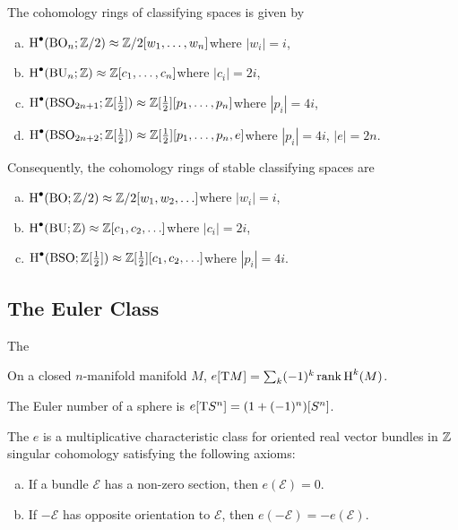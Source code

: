 \begin{theorem}\label{thm:cohomology-o}
	The cohomology rings of classifying spaces is given by
	\begin{enumerate}[(a)]
		\item $\operatorname{H}^\bullet(\mathrm{BO}_n;\mathbb{Z}/2)\approx \mathbb{Z}/2[w_1,\ldots, w_n]$\hfill where $|w_i|=i$,
		\item $\operatorname{H}^\bullet(\mathrm{BU}_n;\mathbb{Z})\approx \mathbb{Z}[c_1,\ldots, c_n]$\hfill where $|c_i|=2i$,
		\item $\operatorname{H}^\bullet(\mathrm{BSO}_{2n+1};\mathbb{Z}[\frac12])\approx \mathbb{Z}[\frac12][p_1,\ldots, p_n]$\hfill where $|p_i|=4i$,
		\item $\operatorname{H}^\bullet(\mathrm{BSO}_{2n+2};\mathbb{Z}[\frac12])\approx \mathbb{Z}[\frac12][p_1,\ldots, p_n, e]$\hfill where $|p_i|=4i$, $|e|=2n$.
	\end{enumerate}
	Consequently, the cohomology rings of stable classifying spaces are 
	\begin{enumerate}[(a)]
		\item $\operatorname{H}^\bullet(\mathrm{BO};\mathbb{Z}/2)\approx \mathbb{Z}/2[w_1,w_2,\ldots]$\hfill where $|w_i|=i$,
		\item $\operatorname{H}^\bullet(\mathrm{BU};\mathbb{Z})\approx \mathbb{Z}[c_1,c_2,\ldots]$\hfill where $|c_i|=2i$,
		\item $\operatorname{H}^\bullet(\mathrm{BSO};\mathbb{Z}[\frac12])\approx \mathbb{Z}[\frac12][c_1,c_2,\ldots]$\hfill where $|p_i|=4i$.
	\end{enumerate}
\end{theorem}

\subsection{The Euler Class}\label{sec:euler-class}

\begin{definition}\label{def:euler-class}
	The 
\end{definition}

\begin{proposition}
	On a closed $n$-manifold manifold $M$, $e[\mathrm{T} M]=\sum_k (-1)^k \operatorname{rank} \operatorname{H}^k(M)$.
\end{proposition}

\begin{corollary}
	The Euler number of a sphere is $e[\mathrm{T} S^n] = (1+(-1)^n)[S^n]$.
\end{corollary}
\begin{definition}
	The  $e$ is a multiplicative characteristic class for oriented real vector bundles in $\mathbb{Z}$ singular cohomology satisfying the following axioms:
	\begin{enumerate}[(a)]
		\item If a bundle $\mathcal{E}$ has a non-zero section, then $e(\mathcal{E})=0$. 
		\item If $-\mathcal{E}$ has opposite orientation to $\mathcal{E}$, then $e(-\mathcal{E})=-e(\mathcal{E})$.
	\end{enumerate}
\end{definition}

